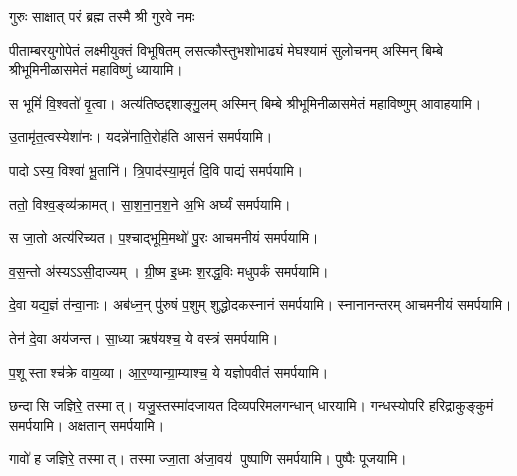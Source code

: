 {गुरुः साक्षात् परं ब्रह्म तस्मै श्री गुरवे नमः}

\begin{center}

{पीताम्बरयुगोपेतं लक्ष्मीयुक्तं विभूषितम्}
{लसत्कौस्तुभशोभाढ्यं मेघश्यामं सुलोचनम्}
अस्मिन् बिम्बे श्रीभूमिनीळासमेतं महाविष्णुं ध्यायामि।
\medskip

{स भूमिं॑ वि॒श्वतो॑ वृ॒त्वा। अत्य॑तिष्ठद्दशाङ्गु॒लम्}
अस्मिन् बिम्बे श्रीभूमिनीळासमेतं महाविष्णुम् आवाहयामि।
\medskip

 {उ॒तामृ॑त॒त्वस्येशा॑नः। यदन्ने॑नाति॒रोह॑ति}
 आसनं समर्पयामि।\medskip

{पादोऽस्य॒ विश्वा॑ भू॒तानि॑। त्रि॒पाद॑स्या॒मृतं॑ दि॒वि}
 पाद्यं समर्पयामि।\medskip
 
{ततो॒ विश्व॒ङ्व्य॑क्रामत्। सा॒श॒ना॒न॒श॒ने अ॒भि}
 अर्घ्यं समर्पयामि।\medskip

{स जा॒तो अत्य॑रिच्यत। प॒श्चाद्भूमि॒मथो॑ पु॒रः}
 आचमनीयं समर्पयामि।\medskip

{व॒स॒न्तो अ॑स्यऽऽसी॒दाज्यम्। ग्री॒ष्म इ॒ध्मः श॒रद्ध॒विः}
मधुपर्कं समर्पयामि।\medskip

 {दे॒वा यद्य॒ज्ञं त॑न्वा॒नाः। अब॑ध्न॒न् पु॑रुषं प॒शुम्}
 शुद्धोदकस्नानं समर्पयामि। स्नानानन्तरम् आचमनीयं समर्पयामि।\medskip

 {तेन॑ दे॒वा अय॑जन्त। सा॒ध्या ऋष॑यश्च॒ ये}
 वस्त्रं समर्पयामि।\medskip

{प॒शूस्ताश्च॑क्रे वाय॒व्या\sn{}। आ॒र॒ण्यान्ग्रा॒म्याश्च॒ ये}
 यज्ञोपवीतं समर्पयामि।\medskip

{छन्दासि जज्ञिरे॒ तस्मात्। यजु॒स्तस्मा॑दजायत}
 दिव्यपरिमलगन्धान् धारयामि। गन्धस्योपरि हरिद्राकुङ्कुमं समर्पयामि। अक्षतान् समर्पयामि।\medskip

{गावो॑ ह जज्ञिरे॒ तस्मात्। तस्माज्जा॒ता अ॑जा॒वय॑}
 पुष्पाणि समर्पयामि।  पुष्पैः पूजयामि।


\end{center}
